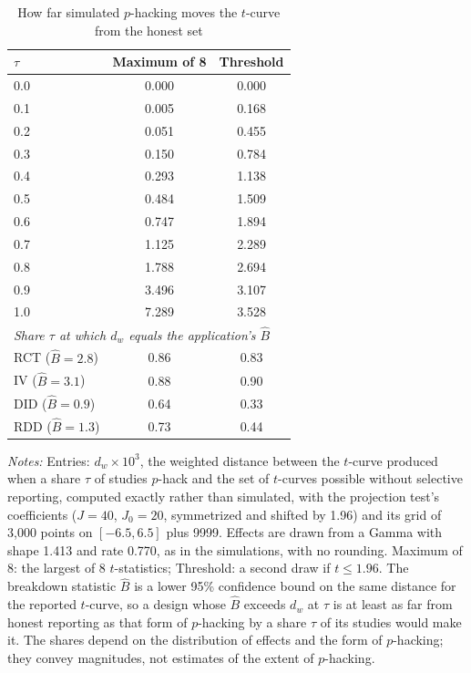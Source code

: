 \begin{table}[htbp]
\centering
\caption{How far simulated $p$-hacking moves the $t$-curve from the honest set}
\label{tab:brodeur_all_power_dw}
\footnotesize
\begin{tabular}{lcc}
\toprule
$\tau$ & Maximum of 8 & Threshold \\
\midrule
0.0 & 0.000 & 0.000 \\
0.1 & 0.005 & 0.168 \\
0.2 & 0.051 & 0.455 \\
0.3 & 0.150 & 0.784 \\
0.4 & 0.293 & 1.138 \\
0.5 & 0.484 & 1.509 \\
0.6 & 0.747 & 1.894 \\
0.7 & 1.125 & 2.289 \\
0.8 & 1.788 & 2.694 \\
0.9 & 3.496 & 3.107 \\
1.0 & 7.289 & 3.528 \\
\midrule
\multicolumn{3}{l}{\textit{Share $\tau$ at which $d_w$ equals the application's $\hat B$}} \\
RCT ($\hat B = 2.8$) & 0.86 & 0.83 \\
IV ($\hat B = 3.1$) & 0.88 & 0.90 \\
DID ($\hat B = 0.9$) & 0.64 & 0.33 \\
RDD ($\hat B = 1.3$) & 0.73 & 0.44 \\
\bottomrule
\end{tabular}
\par\smallskip
\begin{minipage}{\linewidth}\footnotesize\textit{Notes:} Entries: $d_w \times 10^3$, the weighted distance between the $t$-curve produced when a share $\tau$ of studies $p$-hack and the set of $t$-curves possible without selective reporting, computed exactly rather than simulated, with the projection test's coefficients ($J = 40$, $J_0 = 20$, symmetrized and shifted by 1.96) and its grid of 3{,}000 points on $[-6.5, 6.5]$ plus 9999. Effects are drawn from a Gamma with shape 1.413 and rate 0.770, as in the simulations, with no rounding. Maximum of 8: the largest of 8 $t$-statistics; Threshold: a second draw if $t \le 1.96$. The breakdown statistic $\hat B$ is a lower 95\% confidence bound on the same distance for the reported $t$-curve, so a design whose $\hat B$ exceeds $d_w$ at $\tau$ is at least as far from honest reporting as that form of $p$-hacking by a share $\tau$ of its studies would make it. The shares depend on the distribution of effects and the form of $p$-hacking; they convey magnitudes, not estimates of the extent of $p$-hacking.\end{minipage}
\end{table}
